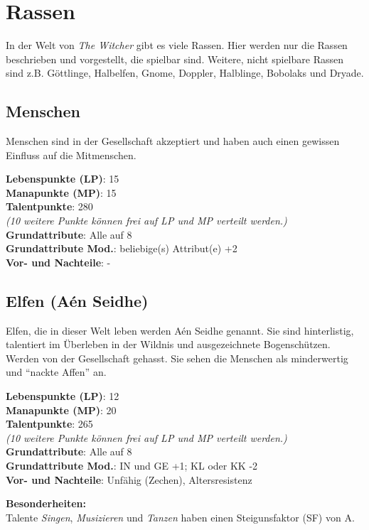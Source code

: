 {\let\clearpage\relax\chapter{Rassen}}
In der Welt von \textit{The Witcher} gibt es viele Rassen. Hier werden nur die Rassen beschrieben und vorgestellt, die spielbar sind. Weitere, nicht spielbare Rassen sind z.B. Göttlinge, Halbelfen, Gnome, Doppler, Halblinge, Bobolaks und Dryade.

\section{Menschen}
Menschen sind in der Gesellschaft akzeptiert und haben auch einen gewissen Einfluss auf die Mitmenschen.

\textbf{Lebenspunkte (LP)}: 15 \\
\textbf{Manapunkte (MP)}: 15 \\
\textbf{Talentpunkte}: 280 \\
\textit{(10 weitere Punkte können frei auf LP und MP verteilt werden.)} \\
\textbf{Grundattribute}: Alle auf 8 \\
\textbf{Grundattribute Mod.}: beliebige(s) Attribut(e) +2  \\
\textbf{Vor- und Nachteile}: - 

\section{Elfen (Aén Seidhe)}
Elfen, die in dieser Welt leben werden Aén Seidhe genannt. Sie sind hinterlistig, talentiert im Überleben in der Wildnis und ausgezeichnete Bogenschützen. Werden von der Gesellschaft gehasst. Sie sehen die Menschen als minderwertig und "`nackte Affen"' an.

\textbf{Lebenspunkte (LP)}: 12 \\
\textbf{Manapunkte (MP)}: 20 \\
\textbf{Talentpunkte}: 265 \\
\textit{(10 weitere Punkte können frei auf LP und MP verteilt werden.)} \\
\textbf{Grundattribute}: Alle auf 8 \\
\textbf{Grundattribute Mod.}: IN und GE +1; KL oder KK -2 \\
\textbf{Vor- und Nachteile}: Unfähig (Zechen), Altersresistenz

\textbf{Besonderheiten:} \\
Talente \textit{Singen}, \textit{Musizieren} und \textit{Tanzen} haben einen Steigunsfaktor (SF) von A.

